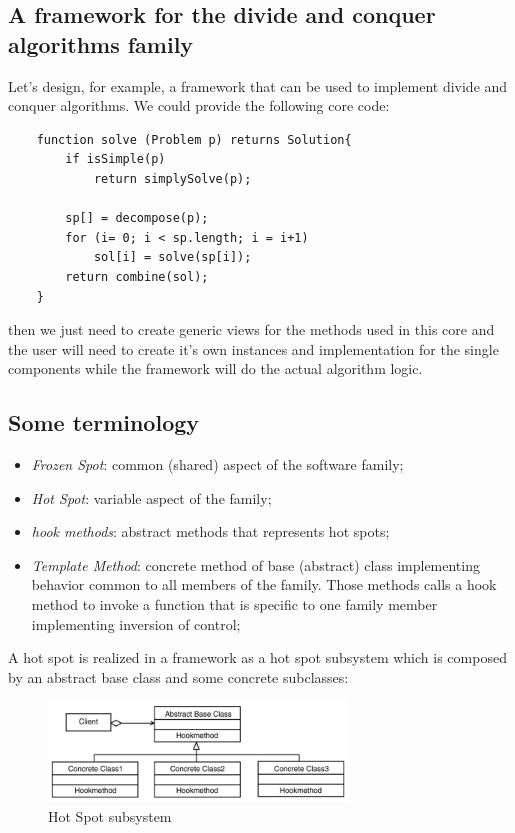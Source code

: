 \subsection{A framework for the divide and conquer algorithms family}
Let's design, for example, a framework that can be used to implement divide and conquer algorithms.
We could provide the following core code:
\begin{verbatim}
    function solve (Problem p) returns Solution{
        if isSimple(p)
            return simplySolve(p);

        sp[] = decompose(p);
        for (i= 0; i < sp.length; i = i+1)
            sol[i] = solve(sp[i]);
        return combine(sol);
    }
\end{verbatim}
then we just need to create generic views for the methods used in this core and the user will need to create it's own instances and implementation for the single components while the framework will do the actual algorithm logic.

\subsection{Some terminology}
\begin{itemize}
    \item \emph{Frozen Spot}: common (shared) aspect of the software family;
    \item \emph{Hot Spot}: variable aspect of the family;
    \item \emph{hook methods}: abstract methods that represents hot spots;
    \item \emph{Template Method}: concrete method of base (abstract) class implementing behavior common to all members of the family. Those methods calls a hook method to invoke a function that is specific to one family member implementing inversion of control;
\end{itemize}
A hot spot is realized in a framework as a hot spot subsystem which is composed by an abstract base class and some concrete subclasses:
\begin{figure}[H]
    \centering
    \includegraphics[width=300px]{images/9_Frameworks/hot_spot_subsystem.png}
    \caption{Hot Spot subsystem}
\end{figure}

